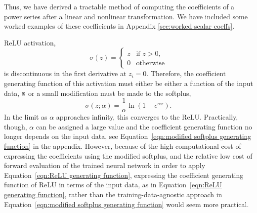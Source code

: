Thus, we have derived a tractable method of computing the coefficients of a power series after a linear and nonlinear transformation. We have included some worked examples of these coefficients in Appendix \ref{sec:worked scalar coeffs}.

ReLU activation,
\[
    \sigma(z) = \begin{cases}
            z   & \mbox{if } z > 0, \\
            0   & \mbox{otherwise}
        \end{cases}
\]
is discontinuous in the first derivative at $z_i = 0$. Therefore, the coefficient generating function of this activation must either be either a function of the input data, ${\bf z}$ or a small modification must be made to the softplus,
\begin{equation}
    \sigma(z; \alpha) = \frac{1}{\alpha} \ln\left( 1 + e^{\alpha x} \right).
    \label{eqn:modified softmax}
\end{equation}
In the limit as $\alpha$ approaches infinity, this converges to the ReLU. Practically, though, $\alpha$ can be assigned a large value and the coefficient generating function no longer depends on the input data, see Equation~\ref{eqn:modified softplus generating function} in {\color{red} the appendix}. However, because of the high computational cost of expressing the coefficients using the modified softplus, and the relative low cost of forward evaluation of the trained neural network in order to apply Equation~\ref{eqn:ReLU generating function}, expressing the coefficient generating function of ReLU in terms of the input data, as in Equation~\ref{eqn:ReLU generating function}, rather than the training-data-agnostic approach in Equation~\ref{eqn:modified softplus generating function} would seem more practical.

